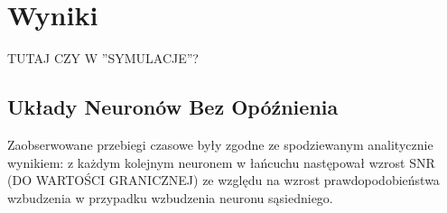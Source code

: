   \section{Wyniki}
  
  TUTAJ CZY W ''SYMULACJE''?
  
  \subsection{Układy Neuronów Bez Opóźnienia}
  
  Zaobserwowane przebiegi czasowe były zgodne ze spodziewanym analitycznie wynikiem: z każdym kolejnym neuronem w łańcuchu następował wzrost SNR (DO WARTOŚCI GRANICZNEJ) ze względu na wzrost prawdopodobieństwa wzbudzenia w przypadku wzbudzenia neuronu sąsiedniego.
